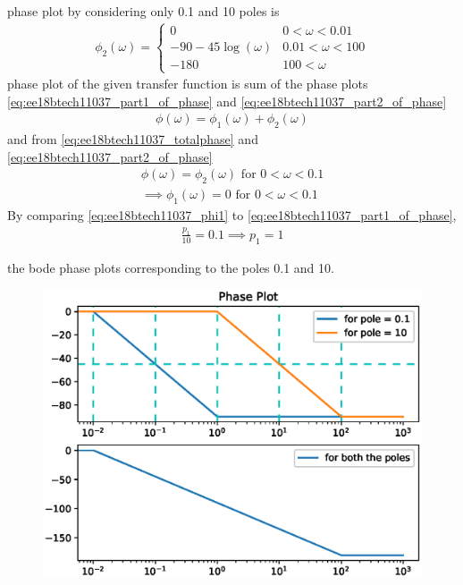 \begin{enumerate}[label=\thesubsection.\arabic*.,ref=\thesubsection.\theenumi]
phase plot by considering only 0.1 and 10 poles is
\begin{align}
\label{eq:ee18btech11037_part2_of_phase}
 \phi_2(\omega) = 
 \begin{cases} 
        0 & 0<\omega<0.01 \\
      -90-45\log(\omega)& 0.01<\omega<100 \\
      -180 & 100<\omega  
 \end{cases}
\end{align}
phase plot of the given transfer function is sum of the phase plots \eqref{eq:ee18btech11037_part1_of_phase} and \eqref{eq:ee18btech11037_part2_of_phase}
\begin{align}
\phi(\omega) = \phi_1(\omega) + \phi_2(\omega) 
\end{align} 
and from \eqref{eq:ee18btech11037_totalphase} and \eqref{eq:ee18btech11037_part2_of_phase}
\begin{align}
\phi(\omega) = \phi_2(\omega)  \text{ for }   0<\omega<0.1 \\
\label{eq:ee18btech11037_phi1}
\implies \phi_1(\omega) = 0 \text{ for } 0<\omega<0.1 
\end{align}
By comparing \eqref{eq:ee18btech11037_phi1} to \eqref{eq:ee18btech11037_part1_of_phase},
\begin{align}
\frac{p_1}{10} = 0.1
\implies p_1 = 1
\end{align}

the bode phase plots corresponding to the poles 0.1 and 10.
\begin{figure}[!ht]
\centering
\includegraphics[width=\columnwidth]{./figs/ee18btech11037/ee18btech11037_2.eps}
\caption{}
\label{fig:ee18btech11037_2}
\end{figure}


\end{enumerate}
